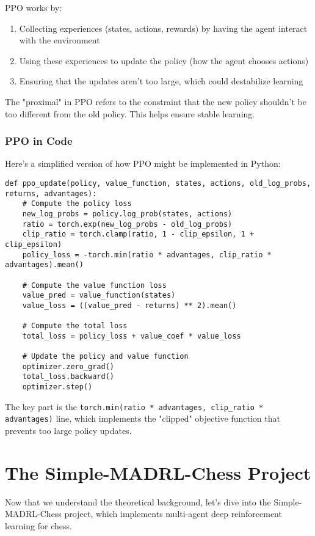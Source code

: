 \documentclass[11pt]{article}
\begin{document}
PPO works by:
\begin{enumerate}
    \item Collecting experiences (states, actions, rewards) by having the agent interact with the environment
    \item Using these experiences to update the policy (how the agent chooses actions)
    \item Ensuring that the updates aren't too large, which could destabilize learning
\end{enumerate}

The "proximal" in PPO refers to the constraint that the new policy shouldn't be too different from the old policy. This helps ensure stable learning.

\subsubsection{PPO in Code}

Here's a simplified version of how PPO might be implemented in Python:

\begin{lstlisting}[style=Python]
def ppo_update(policy, value_function, states, actions, old_log_probs, returns, advantages):
    # Compute the policy loss
    new_log_probs = policy.log_prob(states, actions)
    ratio = torch.exp(new_log_probs - old_log_probs)
    clip_ratio = torch.clamp(ratio, 1 - clip_epsilon, 1 + clip_epsilon)
    policy_loss = -torch.min(ratio * advantages, clip_ratio * advantages).mean()

    # Compute the value function loss
    value_pred = value_function(states)
    value_loss = ((value_pred - returns) ** 2).mean()

    # Compute the total loss
    total_loss = policy_loss + value_coef * value_loss

    # Update the policy and value function
    optimizer.zero_grad()
    total_loss.backward()
    optimizer.step()
\end{lstlisting}

The key part is the \texttt{torch.min(ratio * advantages, clip\_ratio * advantages)} line, which implements the "clipped" objective function that prevents too large policy updates.

\section{The Simple-MADRL-Chess Project}

Now that we understand the theoretical background, let's dive into the Simple-MADRL-Chess project, which implements multi-agent deep reinforcement learning for chess.
\end{document}
